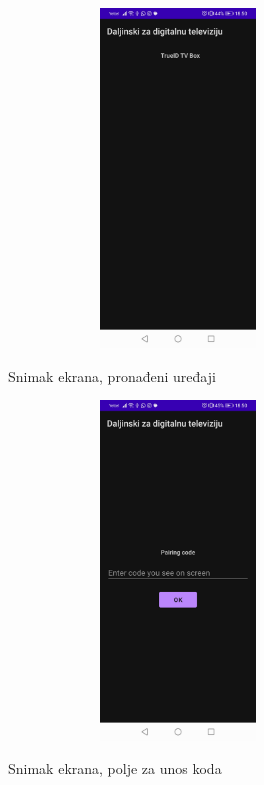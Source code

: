 \documentclass[implementacija.tex]{subfiles}
\begin{document}
\begin{figure}[h!]
\centering
\begin{minipage}{.5\textwidth}
 \centering
  \label{fig:pronadjeni_uredjaji}
  \includegraphics[width=9cm,height=9cm,keepaspectratio]{Implementacija/snimci_ekrana/5_pronadjeni_uredjaji.jpg}
  \caption{Snimak ekrana, pronađeni uređaji}
\end{minipage}%
\begin{minipage}{.5\textwidth}
   \centering
  \label{fig:polje_za_kod}
  \includegraphics[width=9cm,height=9cm,keepaspectratio]{Implementacija/snimci_ekrana/6_uparivanje_sa_uredjajem.jpg}
  \caption{Snimak ekrana, polje za unos koda}
\end{minipage}
\end{figure}
\end{document}
